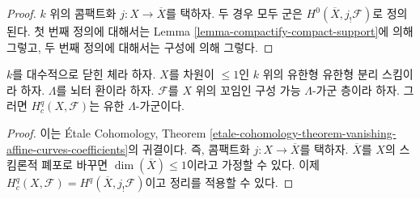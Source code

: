 \begin{proof}
$k$ 위의 콤팩트화 $j : X \to \overline{X}$를 택하자.
두 경우 모두 군은 $H^0(\overline{X}, j_!\mathcal{F})$로 정의된다.
첫 번째 정의에 대해서는 Lemma
\ref{lemma-compactify-compact-support}에 의해 그렇고,
두 번째 정의에 대해서는 구성에 의해 그렇다.
\end{proof}

\begin{lemma}
\label{lemma-finiteness-curves}
$k$를 대수적으로 닫힌 체라 하자. $X$를 차원이 $\leq 1$인
$k$ 위의 유한형 유한형 분리 스킴이라 하자.
$\Lambda$를 뇌터 환이라 하자.
$\mathcal{F}$를 $X$ 위의 꼬임인 구성 가능 $\Lambda$-가군 층이라 하자.
그러면 $H^q_c(X, \mathcal{F})$는 유한 $\Lambda$-가군이다.
\end{lemma}

\begin{proof}
이는 \'Etale Cohomology, Theorem
\ref{etale-cohomology-theorem-vanishing-affine-curves-coefficients}의
귀결이다. 즉, 콤팩트화 $j : X \to \overline{X}$를 택하자.
$\overline{X}$를 $X$의 스킴론적 폐포로 바꾸면
$\dim(\overline{X}) \leq 1$이라고 가정할 수 있다. 이제
$H^q_c(X, \mathcal{F}) = H^q(\overline{X}, j_!\mathcal{F})$이고
정리를 적용할 수 있다.
\end{proof}

